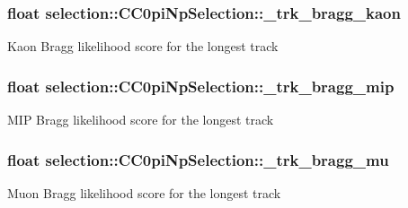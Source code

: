 \subsubsection[{\texorpdfstring{\+\_\+trk\+\_\+bragg\+\_\+kaon}{_trk_bragg_kaon}}]{\setlength{\rightskip}{0pt plus 5cm}float selection\+::\+C\+C0pi\+Np\+Selection\+::\+\_\+trk\+\_\+bragg\+\_\+kaon\hspace{0.3cm}{\ttfamily [private]}}\hypertarget{classselection_1_1CC0piNpSelection_ac9b23583581239191762cfb60307fb78}{}\label{classselection_1_1CC0piNpSelection_ac9b23583581239191762cfb60307fb78}
Kaon Bragg likelihood score for the longest track 
\subsubsection[{\texorpdfstring{\+\_\+trk\+\_\+bragg\+\_\+mip}{_trk_bragg_mip}}]{\setlength{\rightskip}{0pt plus 5cm}float selection\+::\+C\+C0pi\+Np\+Selection\+::\+\_\+trk\+\_\+bragg\+\_\+mip\hspace{0.3cm}{\ttfamily [private]}}\hypertarget{classselection_1_1CC0piNpSelection_aec1e4d27216773ec40bc66ab5c217abc}{}\label{classselection_1_1CC0piNpSelection_aec1e4d27216773ec40bc66ab5c217abc}
M\+IP Bragg likelihood score for the longest track 
\subsubsection[{\texorpdfstring{\+\_\+trk\+\_\+bragg\+\_\+mu}{_trk_bragg_mu}}]{\setlength{\rightskip}{0pt plus 5cm}float selection\+::\+C\+C0pi\+Np\+Selection\+::\+\_\+trk\+\_\+bragg\+\_\+mu\hspace{0.3cm}{\ttfamily [private]}}\hypertarget{classselection_1_1CC0piNpSelection_a9e7b081beb0ef9129f15a7fb965276f1}{}\label{classselection_1_1CC0piNpSelection_a9e7b081beb0ef9129f15a7fb965276f1}
Muon Bragg likelihood score for the longest track 
